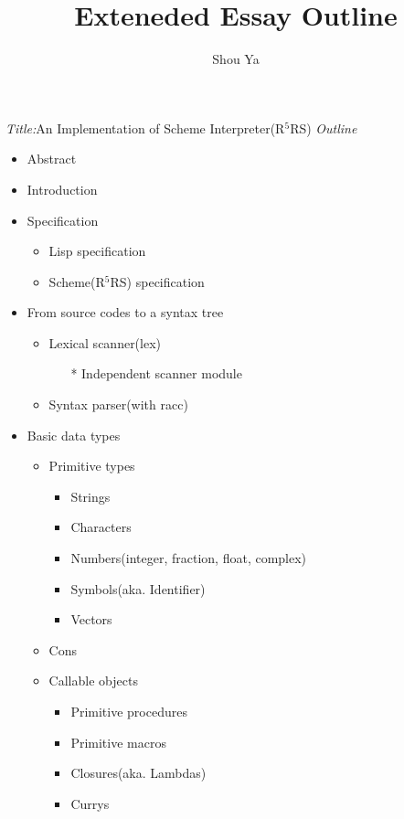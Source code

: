 \documentclass{article}
\title{Exteneded Essay Outline}
\author{Shou Ya}
\begin{document}
\maketitle
\vspace{3em}

\textit{Title:}An Implementation of Scheme Interpreter(R$^5$RS)
\textit{Outline}

\begin{itemize}
\item Abstract
\item Introduction
\item Specification
  \begin{itemize}
  \item Lisp specification
  \item Scheme(R$^5$RS) specification
  \end{itemize}

\item From source codes to a syntax tree
  \begin{itemize}
  \item Lexical scanner(lex)
    \begin{itemize}
    \item[*] Independent scanner module
    \end{itemize}
  \item Syntax parser(with racc)
  \end{itemize}

\item Basic data types
  \begin{itemize}
  \item Primitive types
    \begin{itemize}
    \item Strings
    \item Characters
    \item Numbers(integer, fraction, float, complex)
    \item Symbols(aka. Identifier)
    \item Vectors
    \end{itemize}
  \item Cons
  \item Callable objects
    \begin {itemize}
    \item Primitive procedures
    \item Primitive macros
    \item Closures(aka. Lambdas)
    \item Currys
    \end{itemize}


\end{itemize}
\end{itemize}
\end{document}
